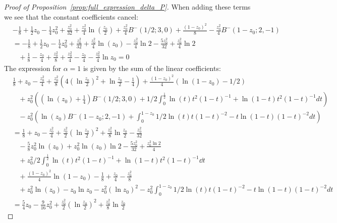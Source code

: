 \begin{proof}[Proof of Proposition~\ref{prop:full_expression_delta_P}]
When adding these terms we see that the constant coefficients cancel:
\begin{align*}
& -\frac{1}{8}+\frac{1}{2}z_0-\frac{1}{4}z_0^2+\frac{z_0^2}{32}+\frac{z_0^2}{4}\ln(\frac{z_0}{2}) +\frac{z_0^2}{4}B^-(1/2;3,0)+\frac{(1-z_0)^2}{8}-\frac{z_0^2}{4}B^-(1-z_0;2,-1) \\
&=-\frac{1}{8}+\frac{1}{2}z_0-\frac{1}{4}z_0^2+\frac{z_0^2}{32}+\frac{z_0^2}{4}\ln(z_0)-\frac{z_0^2}{4}\ln 2 -\frac{5z_0^2}{32}+\frac{z_0^2}{4}\ln2 \\ &\hspace{10pt}+\frac{1}{8}-\frac{z_0}{4}+\frac{z_0^2}{8}+\frac{z_0^2}{4}-\frac{z_0}{4}-\frac{z_0^2}{4}\ln z_0 =0
\end{align*}
The expression for $\alpha=1$ is given by the sum of the linear coefficients:
\begin{align*}
	&\frac{1}{8}+z_0-\frac{z_0^2}{4}+\frac{z_0^2}{8}(4(\ln\frac{z_0}{2})^2+\ln\frac{z_0}{2} - \frac{1}{4}) 
		+\frac{(1-z_0)^2}{4} (\ln(1-z_0)-1/2 )\\
	&\hspace{10pt}+z_0^2\left(\left(\ln(z_0)+\frac{1}{4}\right) B^-(1/2;3,0)+1/2\int_0^{\frac{1}{2}} 
		\ln(t)t^2(1-t)^{-1}+\ln(1-t)t^2(1-t)^{-1}dt \right) \\
	&\hspace{10pt}- z_0^{2}\left(\ln(z_0)B^-(1-z_0;2,-1)+\int_0^{1-z_0} 1/2\ln(t)t(1-t)^{-2}-t\ln(1-t)(1-t)^{-2}dt \right) \\
	&=\frac{1}{8}+z_0-\frac{z_0^2}{4}+\frac{z_0^2}{2}(\ln\frac{z_0}{2})^2
		+\frac{z_0^2}{8}\ln\frac{z_0}{2} - \frac{z_0^2}{32} \\
	&\hspace{10pt}-\frac{5}{8}z_0^2\ln(z_0)+z_0^2\ln(z_0)\ln 2-\frac{5z_0^2}{32} +\frac{z_0^2 \ln2}{4}\\
	&\hspace{10pt}+z_0^2/2\int_0^{\frac{1}{2}} \ln(t)t^2(1-t)^{-1}+\ln(1-t)t^2(1-t)^{-1}\dd t \\
	&\hspace{10pt}+\frac{(1-z_0)^2}{4}\ln(1-z_0) -\frac{1}{8}+\frac{z_0}{4}-\frac{z_0^2}{8}\\
	&\hspace{10pt}+ z_0^2\ln(z_0)-z_0 \ln z_0-z_0^2(\ln z_0)^2
		-z_0^2\int_0^{1-z_0} 1/2\ln(t)t(1-t)^{-2}-t\ln(1-t)(1-t)^{-2}dt \\
	&=\frac{5}{4}z_0-\frac{9}{16}z_0^2 +\frac{z_0^2}{2}(\ln\frac{z_0}{2})^2+\frac{z_0^2}{8}\ln\frac{z_0}{2} 

\end{align*}
\end{proof}
